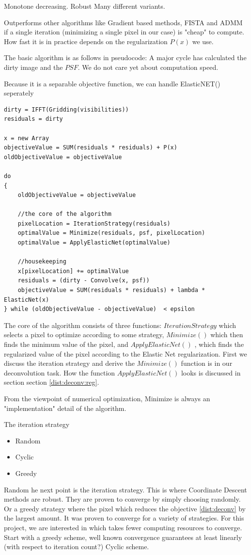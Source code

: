 Monotone decreasing.
Robust
Many different variants.

Outperforms other algorithms like Gradient based methods, FISTA and ADMM if a single iteration (minimizing a single pixel in our case) is "cheap" to compute. 
How fast it is in practice depends on the regularization $P(x)$ we use.

The basic algorithm is as follows in pseudocode: A major cycle has calculated the dirty image and the $PSF$. 
We do not care yet about computation speed.

Because it is a separable objective function, we can handle ElasticNET() seperately

\begin{lstlisting}
dirty = IFFT(Gridding(visibilities))
residuals = dirty

x = new Array
objectiveValue = SUM(residuals * residuals) + P(x)
oldObjectiveValue = objectiveValue

do 
{
	oldObjectiveValue = objectiveValue

	//the core of the algorithm
	pixelLocation = IterationStrategy(residuals)
	optimalValue = Minimize(residuals, psf, pixelLocation)
	optimalValue = ApplyElasticNet(optimalValue)
	
	//housekeeping
	x[pixelLocation] += optimalValue
	residuals = (dirty - Convolve(x, psf))
	objectiveValue = SUM(residuals * residuals) + lambda * ElasticNet(x)
} while (oldObjectiveValue - objectiveValue)  < epsilon
\end{lstlisting}

The core of the algorithm consists of three functions: $IterationStrategy$ which selects a pixel to optimize according to some strategy, $Minimize()$ which then finds the minimum value of the pixel, and $ApplyElasticNet()$ , which finds the regularized value of the pixel according to the Elastic Net regularization. First we discuss the iteration strategy and derive the  $Minimize()$ function is in our deconvolution task. How the function $ApplyElasticNet()$ looks is discussed in section section \ref{dist:deconv:reg}.

From the viewpoint of numerical optimization, Minimize is always an "implementation" detail of the algorithm.

The iteration strategy
\begin{itemize}
	\item Random
	\item Cyclic
	\item Greedy
\end{itemize}
Random 
he next point is the iteration strategy. This is where Coordinate Descent methods are robust. They are proven to converge by simply choosing randomly. Or a greedy strategy where the pixel which reduces the objective \eqref{dist:deconv} by the largest amount. It was proven to converge for a variety of strategies. For this project, we are interested in which takes fewer computing resources to converge. 
Start with a greedy scheme, well known convergence guarantees at least linearly (with respect to iteration count?)\cite{luo1992convergence}
Cyclic scheme.

